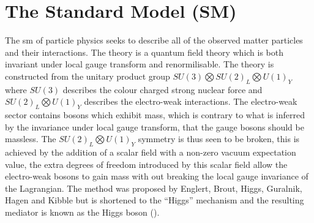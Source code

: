 \section{The Standard Model (SM)} %
\label{sec:the_standard_model_sm_}

The \ac{sm} of particle physics 
\cite{Glashow1961579,PhysRevLett.19.1264,tHooft1972189} seeks to describe all 
of the observed matter particles and their interactions. The theory is a 
quantum field theory which is both invariant under local gauge transform and 
renormilisable. The theory is constructed from the unitary product group 
$SU(3)\bigotimes SU(2)_{L} \bigotimes U(1)_{Y}$ where $SU(3)$ describes the 
colour charged strong nuclear force and $SU(2)_{L} \bigotimes U(1)_{Y}$ 
describes the electro-weak interactions. The electro-weak sector contains 
bosons which exhibit mass, which is contrary to what is inferred by the 
invariance under local gauge transform, that the gauge bosons should be 
massless. The $SU(2)_{L} \bigotimes U(1)_{Y}$ symmetry is thus seen to be 
broken, this is achieved by the addition of a scalar field with a non-zero 
vacuum expectation value, the extra degrees of freedom introduced by this 
scalar field allow the electro-weak bosons to gain mass with out breaking the 
local gauge invariance of the Lagrangian. The method was proposed by Englert, 
Brout, Higgs, Guralnik, Hagen and Kibble 
\cite{tHooft1972189,PhysRevLett.13.321,Higgs1964132,PhysRevLett.13.508,PhysRevLe
tt.13.585,PhysRev.145.1156,PhysRev.155.1554} but 
is shortened to the ``Higgs'' mechanism and the resulting mediator is known as 
the Higgs boson (\PHiggs).

